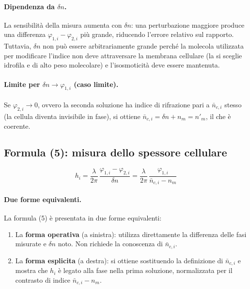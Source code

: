 \paragraph{Dipendenza da $\delta n$.}
La sensibilità della misura aumenta con $\delta n$: una perturbazione maggiore
produce una differenza $\varphi_{1,i} - \varphi_{2,i}$ più grande, riducendo
l'errore relativo sul rapporto. Tuttavia, $\delta n$ non può essere arbitrariamente
grande perché la molecola utilizzata per modificare l'indice non deve
attraversare la membrana cellulare (la si sceglie idrofila e di alto peso
molecolare) e l'isosmoticità deve essere mantenuta.

\paragraph{Limite per $\delta n \to \varphi_{1,i}$ (caso limite).}
Se $\varphi_{2,i} \to 0$, ovvero la seconda soluzione ha indice di rifrazione
pari a $\bar{n}_{c,i}$ stesso (la cellula diventa invisibile in fase), si ottiene
$\bar{n}_{c,i} = \delta n + n_m = n'_m$, il che è coerente.

\subsection{Formula (5): misura dello spessore cellulare}

\begin{equation*}
  h_i
  = \frac{\lambda}{2\pi}\,\frac{\varphi_{1,i} - \varphi_{2,i}}{\delta n}
  = \frac{\lambda}{2\pi}\,\frac{\varphi_{1,i}}{\bar{n}_{c,i} - n_m}
  \tag{5}
\end{equation*}

\paragraph{Due forme equivalenti.}
La formula (5) è presentata in due forme equivalenti:
\begin{enumerate}
  \item La \textbf{forma operativa} (a sinistra): utilizza direttamente la
        differenza delle fasi misurate e $\delta n$ noto. Non richiede la
        conoscenza di $\bar{n}_{c,i}$.
  \item La \textbf{forma esplicita} (a destra): si ottiene sostituendo la
        definizione di $\bar{n}_{c,i}$ e mostra che $h_i$ è legato alla fase
        nella prima soluzione, normalizzata per il contrasto di indice
        $\bar{n}_{c,i} - n_m$.
\end{enumerate}

